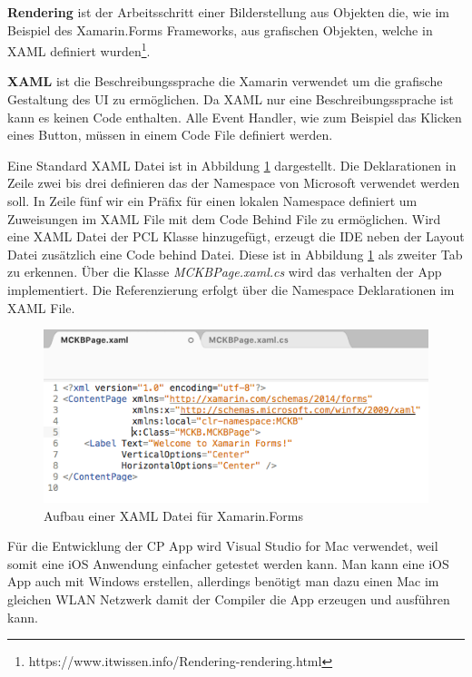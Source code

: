 	\textbf{Rendering} ist der Arbeitsschritt einer Bilderstellung aus Objekten die, wie im Beispiel des Xamarin.Forms Frameworks, aus grafischen Objekten, welche in XAML definiert wurden\footnote{https://www.itwissen.info/Rendering-rendering.html}.

	\textbf{XAML} ist die Beschreibungssprache die Xamarin verwendet um die grafische Gestaltung des UI zu ermöglichen. Da XAML nur eine Beschreibungssprache ist kann es keinen Code enthalten. Alle Event Handler, wie zum Beispiel das Klicken eines Button, müssen in einem Code File definiert werden.

	\newpage
	Eine Standard XAML Datei ist in Abbildung \ref{fig:xamarinaformxamlpreview} dargestellt. Die Deklarationen in Zeile zwei bis drei definieren das der Namespace von Microsoft verwendet werden soll. In Zeile fünf wir ein Präfix für einen lokalen Namespace definiert um Zuweisungen im XAML File mit dem Code Behind File zu ermöglichen. Wird eine XAML Datei der PCL Klasse hinzugefügt, erzeugt die IDE neben der Layout Datei zusätzlich eine Code behind Datei. Diese ist in Abbildung \ref{fig:xamarinaformxamlpreview} als zweiter Tab zu erkennen. Über die Klasse \textit{MCKBPage.xaml.cs} wird das verhalten der App implementiert. Die Referenzierung erfolgt über die Namespace Deklarationen im XAML File.

	\begin{figure}[h!]
		\centering
		\includegraphics[width=1\textwidth]{images/XAML-preview.png}
		\caption[Aufbau einer XAML Datei für Xamarin.Forms]{Aufbau einer XAML Datei für Xamarin.Forms}
		\label{fig:xamarinaformxamlpreview}
	\end{figure}
	Für die Entwicklung der CP App wird Visual Studio for Mac verwendet, weil somit eine iOS Anwendung einfacher getestet werden kann. Man kann eine iOS App auch mit Windows erstellen, allerdings benötigt man dazu einen Mac im gleichen WLAN Netzwerk damit der Compiler die App erzeugen und ausführen kann.

